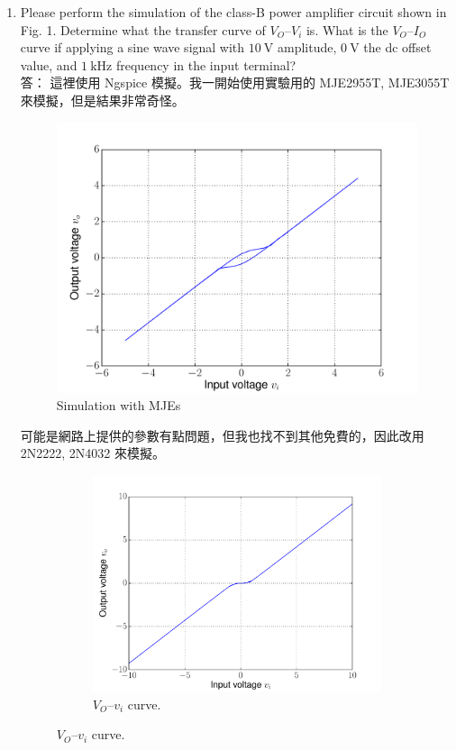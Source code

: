 \documentclass[12pt, a4paper]{article}
\begin{document}
\begin{enumerate}[itemsep=20pt, topsep=10pt]
\item {Please perform the simulation of the class-B power amplifier circuit shown 
    in Fig. 1. Determine what the transfer curve of $V_O\text{--}V_i$ is. 
    What is the $V_O\text{--}I_O$ curve if applying a sine wave signal with $\SI{10}\V$ amplitude,
  $\SI{0}\V$ the dc offset value, and $\SI{1}{\kilo\hertz}$ frequency in the input terminal?} \\[10pt]
    答： 這裡使用 Ngspice 模擬。我一開始使用實驗用的 MJE2955T, MJE3055T 來模擬，但是結果非常奇怪。
    \begin{figure}[H]
    \centering
      \includegraphics[width=.5\textwidth]{ngspice/p1vvbad.pdf}
    \caption{Simulation with MJEs}
    \label{fig:}
    \end{figure}
    可能是網路上提供的參數有點問題，但我也找不到其他免費的，因此改用 2N2222, 2N4032 來模擬。
    \begin{figure}[H]
      \begin{subfigure}{0.48\textwidth}
        \centering
        \includegraphics[width=\textwidth]{ngspice/p1vv.pdf}
        \caption{$V_O\text{--}v_i$ curve.}
      \end{subfigure}%

\end{figure}
\end{enumerate}
\end{document}
